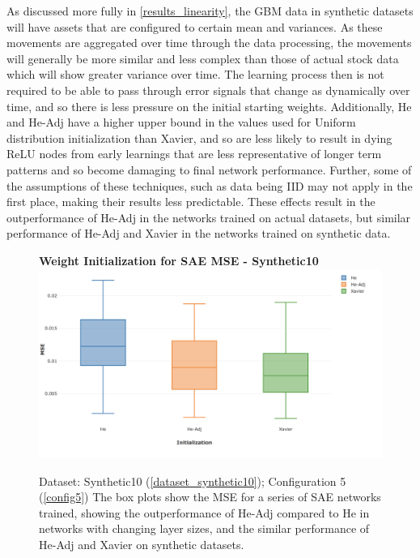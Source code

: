 \documentclass[a4paper,11pt,oneside]{article}
\theoremstyle{plain}
\theoremstyle{definition}
\begin{document}
As discussed more fully in \ref{results_linearity}, the GBM data in synthetic datasets will have assets that are configured to certain mean and variances. As these movements are aggregated over time through the data processing, the movements will generally be more similar and less complex than those of actual stock data which will show greater variance over time. The learning process then is not required to be able to pass through error signals that change as dynamically over time, and so there is less pressure on the initial starting weights. Additionally, He and He-Adj have a higher upper bound in the values used for Uniform distribution initialization than Xavier, and so are less likely to result in dying ReLU nodes from early learnings that are less representative of longer term patterns and so become damaging to final network performance. Further, some of the assumptions of these techniques, such as data being IID may not apply in the first place, making their results less predictable. These effects result in the outperformance of He-Adj in the networks trained on actual datasets, but similar performance of He-Adj and Xavier in the networks trained on synthetic data. \newline

\begin{figure}[H]
	\centering
	\textbf{Weight Initialization for SAE MSE - Synthetic10} 
	\includegraphics[scale=0.35]{images/results/init/Synthetic10_all.png}
	\caption{Dataset: Synthetic10 (\ref{dataset_synthetic10}); Configuration 5 (\ref{config5})
		\newline The box plots show the MSE for a series of SAE networks trained, showing the outperformance of He-Adj compared to He in networks with changing layer sizes, and the similar performance of He-Adj and Xavier on synthetic datasets.}
	\label{figure-results_it4_sae_init}
\end{figure}
\end{document}
